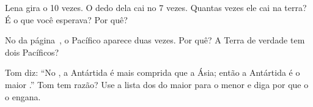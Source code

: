 \begin{exercise}[$\star\star$]\label{exo:g3:continents-and-oceans:8}
Lena gira o  10 vezes. O dedo dela cai no  7 vezes. Quantas vezes
ele cai na terra? É o que você esperava? Por quê?
\end{exercise}

\begin{exercise}[$\star\star$]\label{exo:g3:continents-and-oceans:9}
No  da página~\pageref{fig:g3:continents-and-oceans:world-map}, o
 Pacífico aparece duas vezes. Por quê? A Terra de verdade tem dois
 Pacíficos?
\end{exercise}

\begin{exercise}[$\star\star\star$]\label{exo:g3:continents-and-oceans:10}
Tom diz: ``No , a Antártida é mais comprida que a Ásia; então a
Antártida é o maior .'' Tom tem razão? Use a lista dos
 do maior para o menor e diga por que o  o engana.
\end{exercise}
